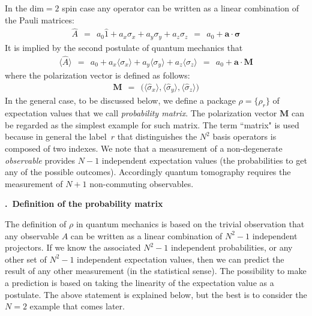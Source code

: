 \documentclass[onecolumn,fleqn, 11pt]{revtex4}
\newcommand{\beq}{\begin{eqnarray}}
\newcommand{\eeq}{\end{eqnarray}}
\renewcommand{\thesubsection}{\arabic{subsection}}
\renewcommand{\thesubsubsection}{\arabic{subsubsection}}
\newcommand{\sheadC}[1]
{
\addtocounter{subsubsection}{1}
\vspace{5mm}
{\bf \thesubsection.\thesubsubsection \ #1}  
\nopagebreak
\phantomsection
}
\begin{document}
In the dim$=2$ spin case any operator can be written 
as a linear combination of the Pauli matrices:
\beq
\hat{A} \ \ = \ \ a_0 \hat{1} + a_x \sigma_x + a_y \sigma_y + a_z \sigma_z \ \ = \ \ a_0 + \bm{a} \cdot \bm{\sigma}
\eeq
It is implied by the second postulate of quantum mechanics that 
\beq
\langle\hat{A}\rangle \ \ = \ \ a_0  + a_x \langle \sigma_x \rangle + a_y \langle \sigma_y \rangle + a_z \langle \sigma_z \rangle
\ \ = \ \  a_0+\bm{a}\cdot\bm{M}
\eeq
where the polarization vector is defined as follows:
\beq
\bm{M} \ \ = \ \ \Big(\langle\hat{\sigma}_x\rangle, \langle\hat{\sigma}_y\rangle, \langle\hat{\sigma}_z\rangle\Big)
\eeq
In the general case, to be discussed below, 
we define a package ${\rho=\{\rho_r\}}$ of expectation values 
that we call {\em probability matrix}. 
The polarization vector $\bm{M}$ can be regarded as the simplest 
example for such matrix. The term ``matrix" is used because 
in general the label~$r$ that distinguishes the $N^2$ basis operators 
is composed of two indexes. We note that a measurement of 
a non-degenerate {\em observable} provides $N{-}1$ independent  
expectation values (the probabilities to get any of the possible outcomes).
Accordingly quantum tomography requires the measurement of $N{+}1$ non-commuting observables.      

 
\sheadC{Definition of the probability matrix} 

The definition of ${\rho}$ in quantum mechanics 
is based on the trivial observation that 
any observable $A$ can be written as a linear 
combination of ${N^2{-}1}$ independent projectors. 
If we know the associated ${N^2{-}1}$ independent probabilities,  
or any other set of ${N^2{-}1}$ independent expectation values,   
then we can predict the result of any other measurement (in the statistical sense). 
The possibility to make a prediction is based 
on taking the linearity of the expectation value as a postulate.
The above statement is explained below, but the best 
is to consider the $N=2$ example that comes later.  
\end{document}
